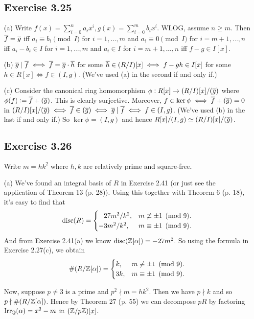 \documentclass[../Marcus.tex]{subfiles}
\begin{document}
\subsection*{Exercise 3.25}

(a) Write $f(x)=\sum_{i=0}^n a_ix^i,g(x)=\sum_{i=0}^m b_ix^i$. WLOG, assume $n\geq m$. Then $\overline{f}=\overline{g}$ iff $a_i\equiv b_i\pmod{I}$ for $i=1,\ldots,m$ and $a_i\equiv 0\pmod{I}$ for $i=m+1,\ldots,n$ iff $a_i-b_i\in I$ for $i=1,\ldots,m$ and $a_i\in I$ for $i=m+1,\ldots,n$ iff $f-g\in I[x]$.

(b) $\overline{g}\mid\overline{f} \iff \overline{f}=\overline{g}\cdot\overline{h}$ for some $\overline{h}\in (R/I)[x] \iff f-gh\in I[x]$ for some $h\in R[x] \iff f\in(I,g)$. (We've used (a) in the second if and only if.)

(c) Consider the canonical ring homomorphism $\phi:R[x]\to(R/I)[x]/(\overline{g})$ where $\phi(f):=\overline{f}+(\overline{g})$. This is clearly surjective. Moreover, $f\in\ker\phi \iff \overline{f}+(\overline{g})=0$ in $(R/I)[x]/(\overline{g}) \iff \overline{f}\in(\overline{g}) \iff \overline{g}\mid\overline{f} \iff f\in(I,g)$. (We've used (b) in the last if and only if.) So $\ker\phi=(I,g)$ and hence $R[x]/(I,g)\simeq (R/I)[x]/(\overline{g})$.

\subsection*{Exercise 3.26}

Write $m=hk^2$ where $h,k$ are relatively prime and square-free.

(a) We've found an integral basis of $R$ in Exercise 2.41 (or just see the application of Theorem 13 (p. 28)). Using this together with Theorem 6 (p. 18), it's easy to find that
$$
\operatorname{disc}(R) =
\begin{cases}
-27m^2/k^2, & m\not\equiv \pm1 \pmod{9}. \\
-3m^2/k^2, & m\equiv \pm1 \pmod{9}.
\end{cases}
$$
And from Exercise 2.41(a) we know $\operatorname{disc}(\mathbb{Z}[\alpha])=-27m^2$. So using the formula in Exercise 2.27(c), we obtain
$$
\#(R/\mathbb{Z}[\alpha]) =
\begin{cases}
k, & m\not\equiv \pm1 \pmod{9}. \\
3k, & m\equiv \pm1 \pmod{9}.
\end{cases}
$$

Now, suppose $p\neq 3$ is a prime and $p^2\nmid m=hk^2$. Then we have $p\nmid k$ and so $p\nmid \#(R/\mathbb{Z}[\alpha])$. Hence by Theorem 27 (p. 55) we can decompose $pR$ by factoring $\operatorname{Irr}_{\mathbb{Q}}(\alpha)=x^3-m$ in $(\mathbb{Z}/p\mathbb{Z})[x]$.
\end{document}
